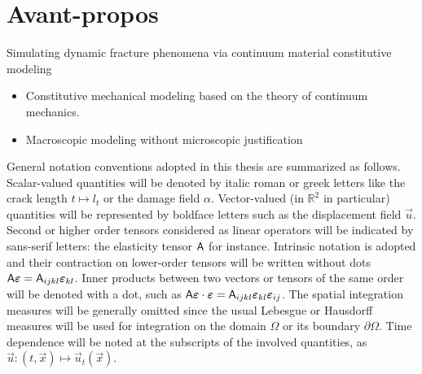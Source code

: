 \chapter{Avant-propos}
Simulating dynamic fracture phenomena via continuum material constitutive modeling

\label{chap:basicassummtions}
\begin{itemize}
\item Constitutive mechanical modeling based on the theory of continuum mechanics.
\item Macroscopic modeling without microscopic justification
\end{itemize}

General notation conventions adopted in this thesis are summarized as follows. Scalar-valued quantities will be denoted by italic roman or greek letters like the crack length $t\mapsto l_t$ or the damage field $\alpha$. Vector-valued (in $\mathbb{R}^2$ in particular) quantities will be represented by boldface letters such as the displacement field $\vec{u}$. Second or higher order tensors considered as linear operators will be indicated by sans-serif letters: the elasticity tensor $\mathsf{A}$ for instance. Intrinsic notation is adopted and their contraction on lower-order tensors will be written without dots $\tens{A}\eps=\tens{A}_{ijkl}\eps_{kl}$. Inner products between two vectors or tensors of the same order will be denoted with a dot, such as $\tens{A}\eps\cdot\eps=\tens{A}_{ijkl}\eps_{kl}\eps_{ij}$. The spatial integration measures will be generally omitted since the usual Lebesgue or Hausdorff measures will be used for integration on the domain $\Omega$ or its boundary $\partial\Omega$. Time dependence will be noted at the subscripts of the involved quantities, as $\vec{u}:(t,\vec{x})\mapsto\vec{u}_t(\vec{x})$.